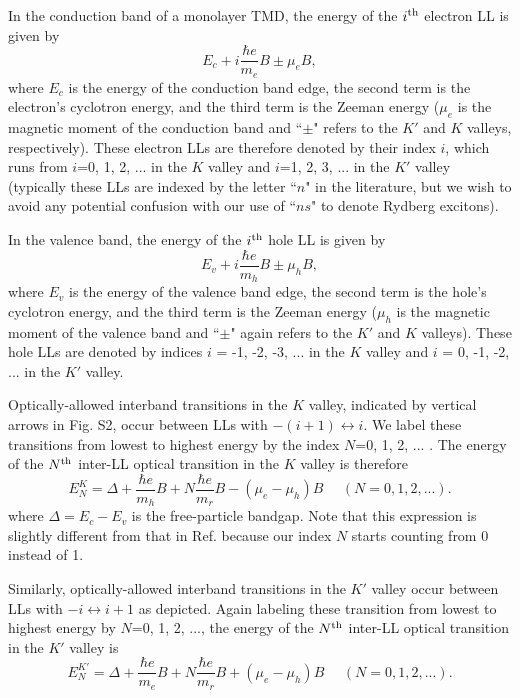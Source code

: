 \documentclass[aps,prl,twocolumn]{revtex4-1}
\begin{document}
In the conduction band of a monolayer TMD, the energy of the $i^{\rm th}$ electron LL is given by 
\begin{equation}
E_c + i \frac{\hbar e}{m_e}B \pm \mu_e B,\label{eq:Eci}
\end{equation}
where $E_c$ is the energy of the conduction band edge, the second term is the electron's cyclotron energy, and the third term is the Zeeman energy ($\mu_e$ is the magnetic moment of the conduction band and ``$\pm$" refers to the $K'$ and $K$ valleys, respectively). These electron LLs are therefore denoted by their index $i$, which runs from $i$=0, 1, 2, ... in the $K$ valley and $i$=1, 2, 3, ... in the $K'$ valley (typically these LLs are indexed by the letter ``$n$" in the literature, but we wish to avoid any potential confusion with our use of ``$ns$" to denote Rydberg excitons).

In the valence band, the energy of the $i^{\rm th}$ hole LL is given by
\begin{equation}
E_v + i \frac{\hbar e}{m_h}B \pm \mu_h B,\label{eq:Evi}
\end{equation}
where $E_v$ is the energy of the valence band edge, the second term is the hole's cyclotron energy, and the third term is the Zeeman energy ($\mu_h$ is the magnetic moment of the valence band and ``$\pm$" again refers to the $K'$ and $K$ valleys). These hole LLs are denoted by indices $i$ = -1, -2, -3, ... in the $K$ valley and $i$ = 0, -1, -2, ... in the $K'$ valley.  

Optically-allowed interband transitions in the $K$ valley, indicated by vertical arrows in Fig. S2, occur between LLs with $-(i+1)\leftrightarrow i$. We label these transitions from lowest to highest energy by the index $N$=0, 1, 2, ... . The energy of the $N^{\rm th}$ inter-LL optical transition in the $K$ valley is therefore
\begin{equation}
E_N^K = \Delta + \frac{\hbar e}{m_h}B + N\frac{\hbar e}{m_r}B - (\mu_e - \mu_h)B ~~~~~~ (N=0, 1, 2,...).
\end{equation}
where $\Delta = E_c - E_v$ is the free-particle bandgap. Note that this expression is slightly different from that in Ref. \cite{Wang_LL} because our index $N$ starts counting from 0 instead of 1. 

Similarly, optically-allowed interband transitions in the $K'$ valley occur between LLs with $-i \leftrightarrow i+1$ as depicted. Again labeling these transition from lowest to highest energy by $N$=0, 1, 2, ..., the energy of the $N^{\rm th}$ inter-LL optical transition in the $K'$ valley is 
\begin{equation}
E_N^{K'} = \Delta + \frac{\hbar e}{m_e}B + N\frac{\hbar e}{m_r}B + (\mu_e - \mu_h)B ~~~~~~ (N=0, 1, 2,...).
\end{equation}
\end{document}
